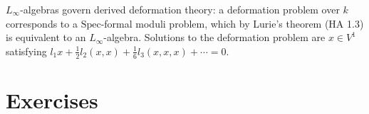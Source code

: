 \begin{remark}
$L_\infty$-algebras govern derived deformation theory: a deformation
problem over $k$ corresponds to a $\mathrm{Spec}$-formal moduli problem,
which by Lurie's theorem (HA 1.3) is equivalent to an $L_\infty$-algebra.
Solutions to the deformation problem are 
$x \in V^1$ satisfying $l_1 x + \frac{1}{2} l_2(x, x) + \frac{1}{6}
l_3(x, x, x) + \cdots = 0$.
\end{remark}


\section{Exercises}
\label{sec:ainf-linf-exercises}

